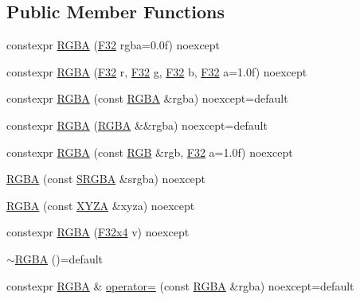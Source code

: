 \subsection*{Public Member Functions}
\begin{DoxyCompactItemize}
\item 
constexpr \mbox{\hyperlink{structmage_1_1_r_g_b_a_afe334e4408a71e808b8cf0bc9dd06dde}{R\+G\+BA}} (\mbox{\hyperlink{namespacemage_aa97e833b45f06d60a0a9c4fc22ae02c0}{F32}} rgba=0.\+0f) noexcept
\item 
constexpr \mbox{\hyperlink{structmage_1_1_r_g_b_a_a12ae339b8bcae0a1c0aacad280963ade}{R\+G\+BA}} (\mbox{\hyperlink{namespacemage_aa97e833b45f06d60a0a9c4fc22ae02c0}{F32}} r, \mbox{\hyperlink{namespacemage_aa97e833b45f06d60a0a9c4fc22ae02c0}{F32}} g, \mbox{\hyperlink{namespacemage_aa97e833b45f06d60a0a9c4fc22ae02c0}{F32}} b, \mbox{\hyperlink{namespacemage_aa97e833b45f06d60a0a9c4fc22ae02c0}{F32}} a=1.\+0f) noexcept
\item 
constexpr \mbox{\hyperlink{structmage_1_1_r_g_b_a_ad399faf871c1dec0ee3c4c0eb89329df}{R\+G\+BA}} (const \mbox{\hyperlink{structmage_1_1_r_g_b_a}{R\+G\+BA}} \&rgba) noexcept=default
\item 
constexpr \mbox{\hyperlink{structmage_1_1_r_g_b_a_a931063ef190241d875856430aa9fbac9}{R\+G\+BA}} (\mbox{\hyperlink{structmage_1_1_r_g_b_a}{R\+G\+BA}} \&\&rgba) noexcept=default
\item 
constexpr \mbox{\hyperlink{structmage_1_1_r_g_b_a_ad766984007f021cdde26f63436d90825}{R\+G\+BA}} (const \mbox{\hyperlink{structmage_1_1_r_g_b}{R\+GB}} \&rgb, \mbox{\hyperlink{namespacemage_aa97e833b45f06d60a0a9c4fc22ae02c0}{F32}} a=1.\+0f) noexcept
\item 
\mbox{\hyperlink{structmage_1_1_r_g_b_a_a82b256781126a25fd7a9a84a75fffb90}{R\+G\+BA}} (const \mbox{\hyperlink{structmage_1_1_s_r_g_b_a}{S\+R\+G\+BA}} \&srgba) noexcept
\item 
\mbox{\hyperlink{structmage_1_1_r_g_b_a_a008be57a6540fee8ed02d285681e3ed4}{R\+G\+BA}} (const \mbox{\hyperlink{structmage_1_1_x_y_z_a}{X\+Y\+ZA}} \&xyza) noexcept
\item 
constexpr \mbox{\hyperlink{structmage_1_1_r_g_b_a_a058e985bdbdf376616d1f6dd121d2dd8}{R\+G\+BA}} (\mbox{\hyperlink{namespacemage_a759aaad2fdc75aa93b5b614eb01712c4}{F32x4}} v) noexcept
\item 
\mbox{\hyperlink{structmage_1_1_r_g_b_a_a139a22381a3fb02d1f28be505b41c9df}{$\sim$\+R\+G\+BA}} ()=default
\item 
constexpr \mbox{\hyperlink{structmage_1_1_r_g_b_a}{R\+G\+BA}} \& \mbox{\hyperlink{structmage_1_1_r_g_b_a_af8b32f51870ad86f65e5307337b42420}{operator=}} (const \mbox{\hyperlink{structmage_1_1_r_g_b_a}{R\+G\+BA}} \&rgba) noexcept=default

\end{DoxyCompactItemize}

